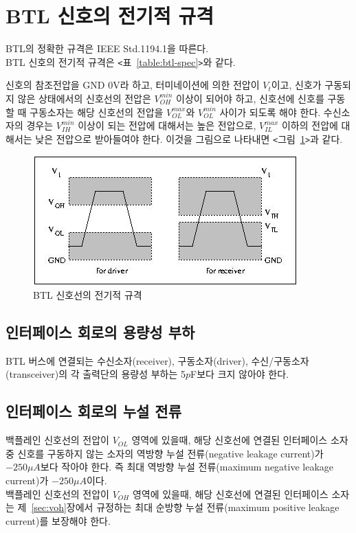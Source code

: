 \section{BTL 신호의 전기적 규격}
BTL의 정확한 규격은 IEEE Std.1194.1을 따른다. \\
%
BTL 신호의 전기적 규격은 {\tt <}표~\ref{table:btl-spec}{\tt >}와 같다.
%

%
신호의 참조전압을 GND 0V라 하고, 터미네이션에 의한 전압이 $V_t$이고,
신호가 구동되지 않은 상태에서의 신호선의 전압은 $V_{OH}^{min}$ 이상이 되어야 하고,
신호선에 신호를 구동할 때 구동소자는 해당 신호선의 전압을 $V_{OL}^{max}$와
$V_{OL}^{min}$ 사이가 되도록 해야 한다.
수신소자의 경우는 $V_{IH}^{min}$ 이상이 되는 전압에 대해서는 높은 전압으로,
$V_{IL}^{max}$ 이하의 전압에 대해서는 낮은 전압으로 받아들여야 한다.
이것을 그림으로 나타내면 {\tt <}그림~\ref{figure:signal-spec-btl}{\tt >}과 같다.
%
\begin{figure}[htb]
    \centerline{\includegraphics{ch7/FIG/signal-spec.jpg}}
   \caption{BTL 신호선의 전기적 규격}\label{figure:signal-spec-btl}
\end{figure}
%

\subsection{인터페이스 회로의 용량성 부하}
%
BTL 버스에 연결되는 수신소자(receiver), 구동소자(driver), 수신/구동소자(transceiver)의
각 출력단의 용량성 부하는 5$p$F보다 크지 않아야 한다.

\subsection{인터페이스 회로의 누설 전류}
%
백플레인 신호선의 전압이 $V_{OL}$ 영역에 있을때,
해당 신호선에 연결된 인터페이스 소자중 신호를 구동하지 않는 소자의 역방향 누설 전류(negative
leakage current)가 $-250\mu A$보다 작아야 한다.
즉 최대 역방향 누설 전류(maximum negative leakage current)가
$-250\mu A$이다.\\
백플레인 신호선의 전압이 $V_{OH}$ 영역에 있을때,
해당 신호선에 연결된 인터페이스 소자는 제~\ref{sec:voh}장에서 규정하는
최대 순방향 누설 전류(maximum positive leakage current)를 보장해야 한다.

